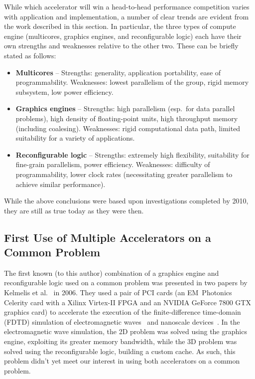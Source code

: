 While which accelerator will win a head-to-head performance competition varies
with application and implementation, a number of clear trends are evident
from the work described in this section.  In particular, the three types
of compute engine (multicores, graphics engines, and reconfigurable logic)
each have their own strengths and weaknesses relative to the other two.
These can be briefly stated as follows:
\begin{itemize}
\item {\bf Multicores} -- Strengths: generality, application portability,
ease of programmability. Weaknesses: lowest parallelism of the group,
rigid memory subsystem, low power efficiency.
\item {\bf Graphics engines} -- Strengths: high parallelism (esp.~for data
parallel problems), high density of floating-point units, high throughput
memory (including coalesing). Weaknesses: rigid computational data path,
limited suitability for a variety of applications.
\item {\bf Reconfigurable logic} -- Strengths: extremely high flexibility,
suitability for fine-grain parallelism, power efficiency.  Weaknesses: 
difficulty of programmability, lower clock rates (necessitating greater
parallelism to achieve similar performance).
\end{itemize}

While the above conclusions were based upon investigations completed
by 2010, they are still as true today as they were then.

\subsection{First Use of Multiple Accelerators on a Common Problem}

The first known (to this author) combination of a graphics engine and
reconfigurable logic used on a common problem was presented
in two papers
by Kelmelis et al.~\cite{khdo06,kdh+06} in 2006.  They used a pair of PCI cards
(an EM~Photonics Celerity card with a Xilinx Virtex-II FPGA and
an NVIDIA GeForce 7800 GTX graphics card) to accelerate the execution of
the finite-difference time-domain (FDTD) simulation of electromagnetic
waves~\cite{khdo06} and nanoscale devices~\cite{kdh+06}.
In the electromagnetic wave simulation, the 2D problem was solved using
the graphics engine, exploiting its greater memory bandwidth, while the 3D
problem was solved using the reconfigurable logic, building a custom cache.
As such, this problem didn't yet meet our interest in using both
accelerators on a common problem.

